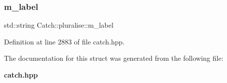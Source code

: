 \subsubsection{m\_label}
{\footnotesize\ttfamily std\+::string Catch\+::pluralise\+::m\+\_\+label}



Definition at line 2883 of file catch.\+hpp.



The documentation for this struct was generated from the following file\+:\begin{DoxyCompactItemize}
\item 
\textbf{ catch.\+hpp}\end{DoxyCompactItemize}

